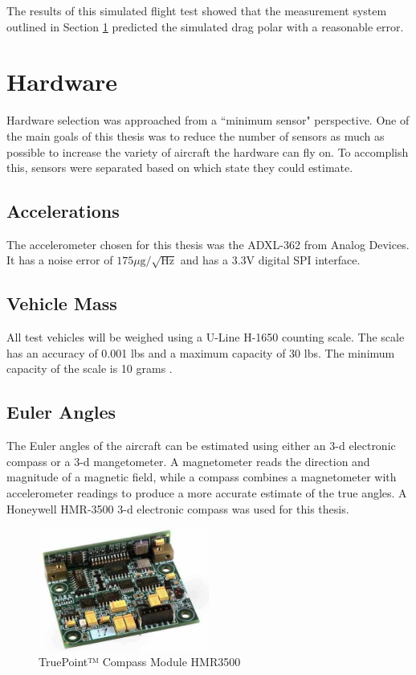 \documentclass[12pt]{ucthesis}
\begin{document}
The results of this simulated flight test showed that the measurement system outlined in Section \ref{hardware} predicted the simulated drag polar with a reasonable error.
\chapter{Hardware}
\label{hardware}
Hardware selection was approached from a ``minimum sensor" perspective. One of the main goals of this thesis was to reduce the number of sensors as much as possible to increase the variety of aircraft the hardware can fly on. To accomplish this, sensors were separated based on which state they could estimate.
\section{Accelerations}
The accelerometer chosen for this thesis was the ADXL-362 from Analog Devices. It has a noise error of $175\mu\text{g}/\sqrt{\text{Hz}}$ and has a 3.3V digital SPI interface\cite{adxl362DataSheet}.
\section{Vehicle Mass}
All test vehicles will be weighed using a U-Line H-1650 counting scale. The scale has an accuracy of 0.001 lbs and a maximum capacity of 30 lbs. The minimum capacity of the scale is 10 grams \cite{U-Line}.
\section{Euler Angles}
The Euler angles of the aircraft can be estimated using either an 3-d electronic compass or a 3-d mangetometer. A magnetometer reads the direction and magnitude of a magnetic field, while a compass combines a magnetometer with accelerometer readings to produce a more accurate estimate of the true angles. A Honeywell HMR-3500 3-d electronic compass was used for this thesis. 

\begin{figure}[H]
  \caption{TruePoint™ Compass Module 
  HMR3500 } \label{hmr3500Picture}
  \centering
    \includegraphics[width=0.5\textwidth]{figures/hmr3500.jpg}
\end{figure}
\end{document}
